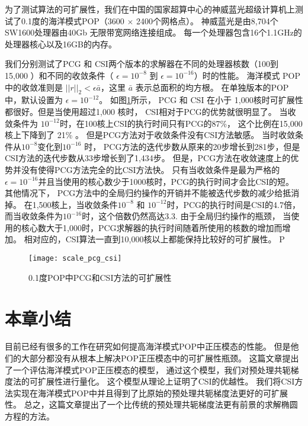  
为了测试算法的可扩展性，我们在中国的国家超算中心的神威蓝光超级计算机上测试了0.1度的海洋模式POP（3600 $\times$ 2400个网格点）。
神威蓝光是由8,704个SW1600处理器由40Gb 无限带宽网络连接组成。
每一个处理器包含16个1.1GHz的处理器核心以及16GB的内存。 


我们分别测试了PCG 和 CSI两个版本的求解器在不同的处理器核数（100到 15,000 ）和不同的收敛条件（ $\epsilon = 10^{-8}$ 到 $\epsilon = 10^{-16}$）时的性能。
海洋模式 POP 中的收敛准则是 $||r||_2<\epsilon \bar{a}$，这里 $\bar{a}$ 表示总面积的均方根。 
在单独版本的POP中，默认设置为 $\epsilon = 10^{-12}$。 
如图\ref{fig:scale}所示， PCG 和 CSI 在小于  1,000核时可扩展性都很好。但是当使用超过1,000 核时， CSI相对于PCG的优势就很明显了。 
当收敛条件为 $10^{-12}$时，在100核上CSI的执行时间只有PCG的87\%， 这个比例在15,000核上下降到了 21\% 。
但是PCG方法对于收敛条件没有CSI方法敏感。 
当时收敛条件从$10^{-8}$变化到$10^{-16}$ 时， PCG方法的迭代步数从原来的20步增长到281步，但是CSI方法的迭代步数从33步增长到了1,434步。 
但是，PCG方法在收敛速度上的优势并没有使得PCG方法完全的比CSI方法快。 
只有当收敛条件是最为严格的$\epsilon = 10^{-16}$并且当使用的核心数少于1000核时，PCG的执行时间才会比CSI的短。
其他情况下， PCG方法中的全局归约操作的开销并不能被迭代步数的减少给抵消掉。
在1,500核上，当收敛条件$10^{-8}$ 和 $10^{-12}$时，PCG的执行时间是CSI的4.7倍， 而当收敛条件为$10^{-16}$时，这个倍数仍然高达3.3. 
由于全局归约操作的瓶颈， 当使用的核心数大于1,000时，PCG求解器的执行时间随着所使用的核数的增加而增加。 
相对应的，CSI算法一直到10,000核以上都能保持比较好的可扩展性。 
P 

\begin {figure}
\centering
\texttt{[image: scale\_pcg\_csi]}
\caption []{ 0.1度POP中PCG和CSI方法的可扩展性 \label {fig:scale}}
\end {figure}


 

 

\section{本章小结}
\label{solver:Conclusion}

目前已经有很多的工作在研究如何提高海洋模式POP中正压模态的性能。 
但是他们的大部分都没有从根本上解决POP正压模态中的可扩展性瓶颈。 
这篇文章提出了一个评估海洋模式POP正压模态的模型， 通过这个模型，我们对预处理共轭梯度法的可扩展性进行量化。 
这个模型从理论上证明了CSI的优越性。 
我们将CSI方法实现在海洋模式POP中并且得到了比原始的预处理共轭梯度法更好的可扩展性。 
总之，这篇文章提出了一个比传统的预处理共轭梯度法更有前景的求解椭圆方程的方法。 


